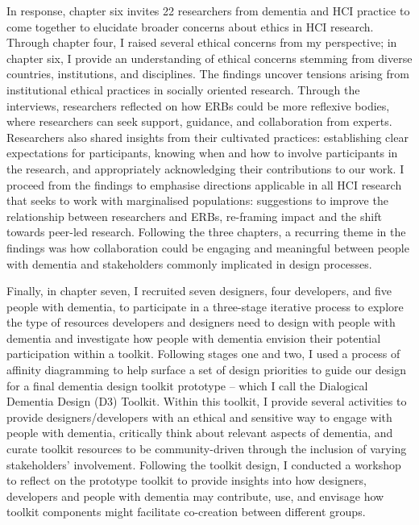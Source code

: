 In response, chapter six invites 22 researchers from dementia and HCI practice to come together to elucidate broader concerns about ethics in HCI research. Through chapter four, I raised several ethical concerns from my perspective; in chapter six, I provide an understanding of ethical concerns stemming from diverse countries, institutions, and disciplines. The findings uncover tensions arising from institutional ethical practices in socially oriented research. Through the interviews, researchers reflected on how ERBs could be more reflexive bodies, where researchers can seek support, guidance, and collaboration from experts. Researchers also shared insights from their cultivated practices: establishing clear expectations for participants, knowing when and how to involve participants in the research, and appropriately acknowledging their contributions to our work. I proceed from the findings to emphasise directions applicable in all HCI research that seeks to work with marginalised populations: suggestions to improve the relationship between researchers and ERBs, re-framing impact and the shift towards peer-led research. Following the three chapters, a recurring theme in the findings was how collaboration could be engaging and meaningful between people with dementia and stakeholders commonly implicated in design processes.

Finally, in chapter seven, I recruited seven designers, four developers, and five people with dementia, to participate in a three-stage iterative process to explore the type of resources developers and designers need to design with people with dementia and investigate how people with dementia envision their potential participation within a toolkit. Following stages one and two, I used a process of affinity diagramming to help surface a set of design priorities to guide our design for a final dementia design toolkit prototype – which I call the Dialogical Dementia Design (D3) Toolkit. Within this toolkit, I provide several activities to provide designers/developers with an ethical and sensitive way to engage with people with dementia, critically think about relevant aspects of dementia, and curate toolkit resources to be community-driven through the inclusion of varying stakeholders’ involvement. Following the toolkit design, I conducted a workshop to reflect on the prototype toolkit to provide insights into how designers, developers and people with dementia may contribute, use, and envisage how toolkit components might facilitate co-creation between different groups.

